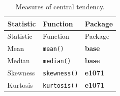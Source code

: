 \documentclass[english,10pt,a4paper,oneside]{book}
\theoremstyle{definition}
\theoremstyle{definition}
\theoremstyle{definition}
\theoremstyle{remark}
\begin{document}
\begin{longtable}[]{@{}lll@{}}
\caption{Measures of central tendency.}\tabularnewline
\toprule
\begin{minipage}[b]{0.25\columnwidth}\raggedright
Statistic\strut
\end{minipage} & \begin{minipage}[b]{0.18\columnwidth}\raggedright
Function\strut
\end{minipage} & \begin{minipage}[b]{0.18\columnwidth}\raggedright
Package\strut
\end{minipage}\tabularnewline
\midrule
\endfirsthead
\toprule
\begin{minipage}[b]{0.25\columnwidth}\raggedright
Statistic\strut
\end{minipage} & \begin{minipage}[b]{0.18\columnwidth}\raggedright
Function\strut
\end{minipage} & \begin{minipage}[b]{0.18\columnwidth}\raggedright
Package\strut
\end{minipage}\tabularnewline
\midrule
\endhead
\begin{minipage}[t]{0.25\columnwidth}\raggedright
Mean\strut
\end{minipage} & \begin{minipage}[t]{0.18\columnwidth}\raggedright
\texttt{mean()}\strut
\end{minipage} & \begin{minipage}[t]{0.18\columnwidth}\raggedright
\textbf{base}\strut
\end{minipage}\tabularnewline
\begin{minipage}[t]{0.25\columnwidth}\raggedright
Median\strut
\end{minipage} & \begin{minipage}[t]{0.18\columnwidth}\raggedright
\texttt{median()}\strut
\end{minipage} & \begin{minipage}[t]{0.18\columnwidth}\raggedright
\textbf{base}\strut
\end{minipage}\tabularnewline
\begin{minipage}[t]{0.25\columnwidth}\raggedright
Skewness\strut
\end{minipage} & \begin{minipage}[t]{0.18\columnwidth}\raggedright
\texttt{skewness()}\strut
\end{minipage} & \begin{minipage}[t]{0.18\columnwidth}\raggedright
\textbf{e1071}\strut
\end{minipage}\tabularnewline
\begin{minipage}[t]{0.25\columnwidth}\raggedright
Kurtosis\strut
\end{minipage} & \begin{minipage}[t]{0.18\columnwidth}\raggedright
\texttt{kurtosis()}\strut
\end{minipage} & \begin{minipage}[t]{0.18\columnwidth}\raggedright
\textbf{e1071}\strut
\end{minipage}\tabularnewline
\bottomrule
\end{longtable}
\end{document}
